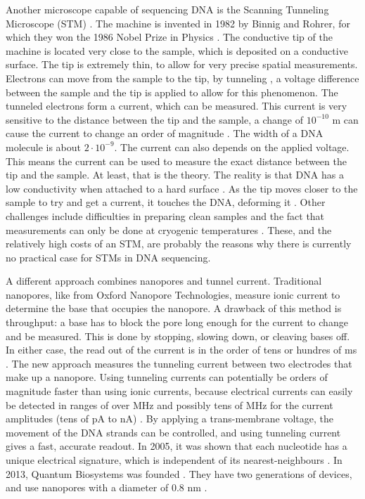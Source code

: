\documentclass[../main/thesis.tex]{subfiles}
\begin{document}
Another microscope capable of sequencing DNA is the Scanning Tunneling Microscope (STM) \cite{STM}.
The machine is invented in 1982 by Binnig and Rohrer, for which they won the 1986 Nobel Prize in Physics \cite{STM_nobel}.
The conductive tip of the machine is located very close to the sample, which is deposited on a conductive surface.
The tip is extremely thin, to allow for very precise spatial measurements.
Electrons can move from the sample to the tip, by tunneling \cite{STM_harvard}, a voltage difference between the sample and the tip is applied to allow for this phenomenon.
The tunneled electrons form a current, which can be measured.
This current is very sensitive to the distance between the tip and the sample, a change of $10^{-10}$ m can cause the current to change an order of magnitude \cite{STM_DNA}.
The width of a DNA molecule is about $2\cdot10^{-9}$.
The current can also depends on the applied voltage.
This means the current can be used to measure the exact distance between the tip and the sample.
At least, that is the theory.
The reality is that DNA has a low conductivity when attached to a hard surface \cite{STM_DNA2}.
As the tip moves closer to the sample to try and get a current, it touches the DNA, deforming it \cite{STM_DNA}.
Other challenges include difficulties in preparing clean samples and the fact that measurements can only be done at cryogenic temperatures \cite{STM_DNA2}.
These, and the relatively high costs of an STM, are probably the reasons why there is currently no practical case for STMs in DNA sequencing.


A different approach combines nanopores and tunnel current.
Traditional nanopores, like from Oxford Nanopore Technologies, measure ionic current to determine the base that occupies the nanopore.
A drawback of this method is throughput: a base has to block the pore long enough for the current to change and be measured.
This is done by stopping, slowing down, or cleaving bases off.
In either case, the read out of the current is in the order of tens or hundres of ms \cite{nanopore_tunnel2}.
The new approach measures the tunneling current between two electrodes that make up a nanopore.
Using tunneling currents can potentially be orders of magnitude faster than using ionic currents, because electrical currents can easily be detected in ranges of over MHz and possibly tens of MHz for the current amplitudes (tens of pA to nA) \cite{nanopore_tunnel2}.
By applying a trans-membrane voltage, the movement of the DNA strands can be controlled, and using tunneling current gives a fast, accurate readout.
In 2005, it was shown that each nucleotide has a unique electrical signature, which is independent of its nearest-neighbours \cite{nanopore_tunnel}.
In 2013, Quantum Biosystems was founded \cite{quantum_biosystems}.
They have two generations of devices, and use nanopores with a diameter of 0.8 nm \cite{quantum_biosystems2}.
\end{document}
